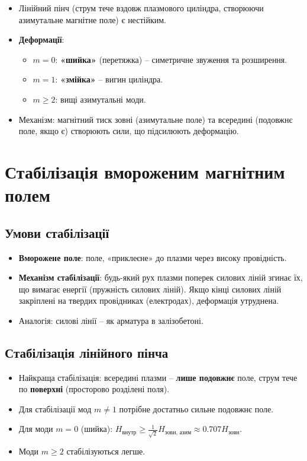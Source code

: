 \documentclass[a4paper,12pt]{article}
\begin{document}
\begin{itemize}
    \item Лінійний пінч (струм тече вздовж плазмового циліндра, створюючи азимутальне магнітне поле) є нестійким.
    \item \textbf{Деформації}:
    \begin{itemize}
        \item $m = 0$: \textbf{«шийка»} (перетяжка) – симетричне звуження та розширення.
        \item $m = 1$: \textbf{«змійка»} – вигин циліндра.
        \item $m \ge 2$: вищі азимутальні моди.
    \end{itemize}
    \item Механізм: магнітний тиск зовні (азимутальне поле) та всередині (подовжнє поле, якщо є) створюють сили, що підсилюють деформацію.
\end{itemize}

\section{Стабілізація вмороженим магнітним полем}

\subsection{Умови стабілізації}

\begin{itemize}
    \item \textbf{Вморожене поле}: поле, «приклеєне» до плазми через високу провідність.
    \item \textbf{Механізм стабілізації}: будь-який рух плазми поперек силових ліній згинає їх, що вимагає енергії (пружність силових ліній). Якщо кінці силових ліній закріплені на твердих провідниках (електродах), деформація утруднена.
    \item Аналогія: силові лінії – як арматура в залізобетоні.
\end{itemize}

\subsection{Стабілізація лінійного пінча}

\begin{itemize}
    \item Найкраща стабілізація: всередині плазми – \textbf{лише подовжнє} поле, струм тече по \textbf{поверхні} (просторово розділені поля).
    \item Для стабілізації мод $m \neq 1$ потрібне достатньо сильне подовжнє поле.
    \item Для моди $m = 0$ (шийка): $H_{\text{внутр}} \ge \frac{1}{\sqrt{2}} H_{\text{зовн, азим}} \approx 0.707 H_{\text{зовн}}$.
    \item Моди $m \ge 2$ стабілізуються легше.
\end{itemize}
\end{document}
